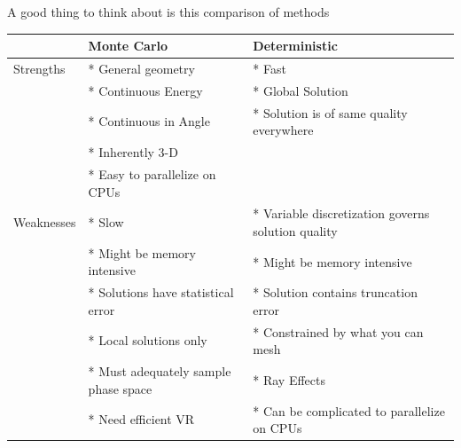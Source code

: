 \documentclass[12pt]{article}
\begin{document}
A good thing to think about is this comparison of methods
\begin{center}
\begin{tabu}{| l | X | X |}
  \hline
  & Monte Carlo         & Deterministic \\\hline
    Strengths & * General geometry    & * Fast \\
              & * Continuous Energy   & * Global Solution\\
              & * Continuous in Angle & * Solution is of same quality everywhere\\
              & * Inherently 3-D      & \\
              & * Easy to parallelize on CPUs & \\\hline
    Weaknesses & * Slow & * Variable discretization governs solution quality \\
               & * Might be memory intensive & * Might be memory intensive \\
               & * Solutions have statistical error & * Solution contains truncation error\\
               & * Local solutions only & * Constrained by what you can mesh \\
               & * Must adequately sample phase space & * Ray Effects \\
               & * Need efficient VR & * Can be complicated to parallelize on CPUs \\\hline
  \end{tabu}
\end{center}


\end{document}
